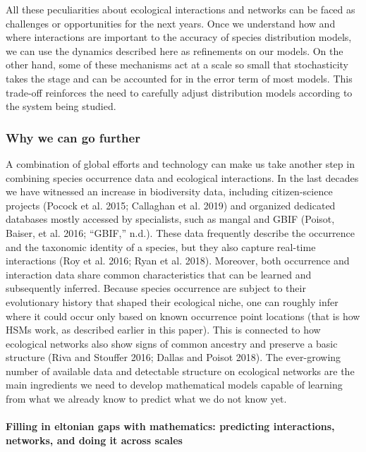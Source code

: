 \documentclass[11pt]{article}
\begin{document}
All these peculiarities about ecological interactions and networks can
be faced as challenges or opportunities for the next years. Once we
understand how and where interactions are important to the accuracy of
species distribution models, we can use the dynamics described here as
refinements on our models. On the other hand, some of these mechanisms
act at a scale so small that stochasticity takes the stage and can be
accounted for in the error term of most models. This trade-off
reinforces the need to carefully adjust distribution models according to
the system being studied.

\hypertarget{why-we-can-go-further}{%
\subsubsection{Why we can go further}\label{why-we-can-go-further}}

A combination of global efforts and technology can make us take another
step in combining species occurrence data and ecological interactions.
In the last decades we have witnessed an increase in biodiversity data,
including citizen-science projects (Pocock et al. 2015; Callaghan et al.
2019) and organized dedicated databases mostly accessed by specialists,
such as mangal and GBIF (Poisot, Baiser, et al. 2016; {``GBIF,''} n.d.).
These data frequently describe the occurrence and the taxonomic identity
of a species, but they also capture real-time interactions (Roy et al.
2016; Ryan et al. 2018). Moreover, both occurrence and interaction data
share common characteristics that can be learned and subsequently
inferred. Because species occurrence are subject to their evolutionary
history that shaped their ecological niche, one can roughly infer where
it could occur only based on known occurrence point locations (that is
how HSMs work, as described earlier in this paper). This is connected to
how ecological networks also show signs of common ancestry and preserve
a basic structure (Riva and Stouffer 2016; Dallas and Poisot 2018). The
ever-growing number of available data and detectable structure on
ecological networks are the main ingredients we need to develop
mathematical models capable of learning from what we already know to
predict what we do not know yet.

\hypertarget{filling-in-eltonian-gaps-with-mathematics-predicting-interactions-networks-and-doing-it-across-scales}{%
\paragraph{Filling in eltonian gaps with mathematics: predicting
interactions, networks, and doing it across
scales}\label{filling-in-eltonian-gaps-with-mathematics-predicting-interactions-networks-and-doing-it-across-scales}}
\end{document}
